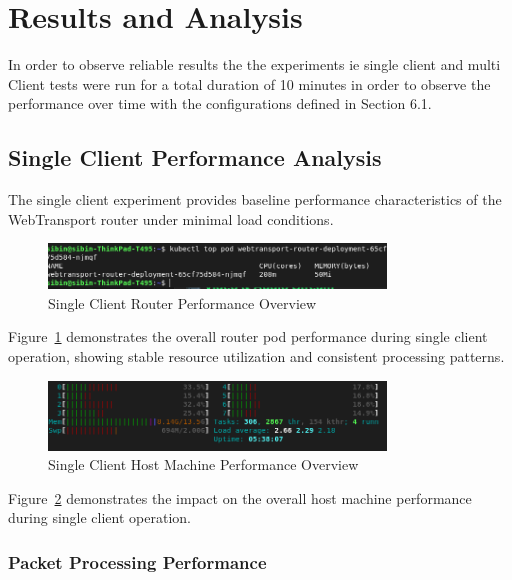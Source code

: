 \section{Results and Analysis}
In order to observe reliable results the the experiments ie single client and multi Client tests were run for a total duration of 10 minutes in order to observe the performance over time with the configurations defined in Section 6.1.

\subsection{Single Client Performance Analysis}

The single client experiment provides baseline performance characteristics of the WebTransport router under minimal load conditions.
\begin{figure}[h!]
\centering
\includegraphics[width=0.8\textwidth]{Evaluation/new-single-client-stats.png}
\caption{Single Client Router Performance Overview}
\label{fig:single-client-overview}
\end{figure}

Figure~\ref{fig:single-client-overview} demonstrates the overall router pod performance during single client operation, showing stable resource utilization and consistent processing patterns.

\begin{figure}[h!]
\centering
\includegraphics[width=0.8\textwidth]{Evaluation/single-client-host-stats.png}
\caption{Single Client Host Machine Performance Overview}
\label{fig:single-client-host-overview}
\end{figure}
Figure~\ref{fig:single-client-host-overview} demonstrates the impact on the overall host machine performance during single client operation.



\subsubsection{Packet Processing Performance}


